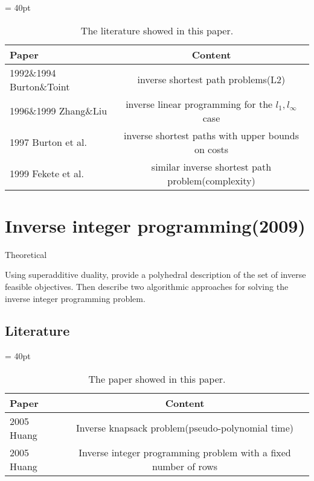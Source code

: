 \documentclass[UTF8]{article}
\begin{document}
\begin{table}[ht]

 \tabcolsep = 40pt

 \small\renewcommand{}

 \caption{The literature showed in this paper.\label{tab:6}}

 {\begin{tabular}{lc}
   \hline
   Paper                    & Content                                                  \\
   \hline
   1992\&1994 Burton\&Toint & inverse shortest path problems(L2)                       \\
   \hline
   1996\&1999 Zhang\&Liu    & inverse linear programming for the  $l_1, l_\infty$ case \\
   \hline
   1997 Burton et al.       & inverse shortest paths with upper bounds on costs        \\
   \hline
   1999 Fekete et al.       & similar inverse shortest path problem(complexity)        \\
   \hline
  \end{tabular}}
 {}
\end{table}



\section{Inverse integer programming(2009)}

Theoretical

Using superadditive duality, provide a polyhedral description of the set of inverse feasible objectives. Then describe two algorithmic approaches for solving the inverse integer programming problem.


\subsection{Literature}


\begin{table}[ht]

 \tabcolsep = 40pt

 \small\renewcommand{}

 \caption{The paper showed in this paper.\label{tab:7}}

 {\begin{tabular}{lc}
   \hline
   Paper      & Content                                                         \\
   \hline
   2005 Huang & Inverse knapsack problem(pseudo-polynomial time)                \\
   \hline
   2005 Huang & Inverse integer programming problem with a fixed number of rows \\
   \hline
  \end{tabular}}
 {}
\end{table}
\end{document}
